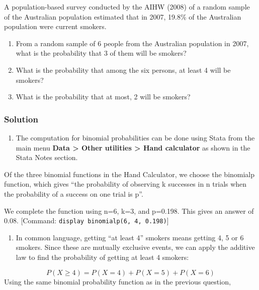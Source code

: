 \documentclass[
]{memoir}
\providecommand{\tightlist}{%
  \setlength{\itemsep}{0pt}\setlength{\parskip}{0pt}}
\begin{document}
A population-based survey conducted by the AIHW (2008) of a random sample of the Australian population estimated that in 2007, 19.8\% of the Australian population were current smokers.

\begin{enumerate}
\def\labelenumi{\alph{enumi})}
\tightlist
\item
  From a random sample of 6 people from the Australian population in 2007, what is the probability that 3 of them will be smokers?
\item
  What is the probability that among the six persons, at least 4 will be smokers?
\item
  What is the probability that at most, 2 will be smokers?
\end{enumerate}

\hypertarget{solution}{%
\subsubsection{Solution}\label{solution}}

\begin{enumerate}
\def\labelenumi{\alph{enumi})}
\tightlist
\item
  The computation for binomial probabilities can be done using Stata from the main menu \textbf{Data \textgreater{} Other utilities \textgreater{} Hand calculator} as shown in the Stata Notes section.
\end{enumerate}

Of the three binomial functions in the Hand Calculator, we choose the binomialp function, which gives ``the probability of observing k successes in n trials when the probability of a success on one trial is p''.

We complete the function using n=6, k=3, and p=0.198. This gives an answer of 0.08.
{[}Command: \texttt{display\ binomialp(6,\ 4,\ 0.198)}{]}

\begin{enumerate}
\def\labelenumi{\alph{enumi})}
\setcounter{enumi}{1}
\tightlist
\item
  In common language, getting ``at least 4'' smokers means getting 4, 5 or 6 smokers. Since these are mutually exclusive events, we can apply the additive law to find the probability of getting at least 4 smokers:
\end{enumerate}

\[ P(X \ge 4) = P(X=4) + P(X=5) + P(X=6) \]
Using the same binomial probability function as in the previous question,
\end{document}

